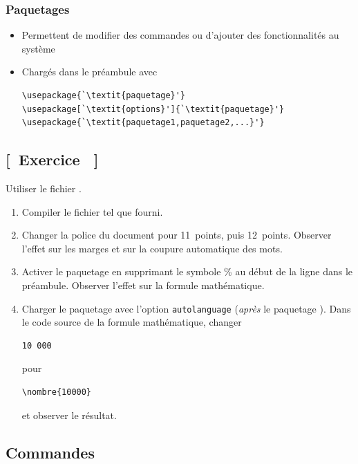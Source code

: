 \begin{frame}[fragile=singleslide]
  \frametitle{Paquetages}
  \begin{itemize}
  \item Permettent de modifier des commandes ou d'ajouter des
    fonctionnalités au système
  \item Chargés dans le préambule avec
    \begin{lstlisting}
\usepackage{`\textit{paquetage}'}
\usepackage[`\textit{options}']{`\textit{paquetage}'}
\usepackage{`\textit{paquetage1,paquetage2,...}'}
    \end{lstlisting}
  \end{itemize}
\end{frame}

\subsection{[~Exercice \theexerciceref~]}

\begin{frame}[plain,fragile=singleslide]
  \begin{exercice}
    Utiliser le fichier .
    \begin{enumerate}
    \item Compiler le fichier tel que fourni.
    \item Changer la police du document pour 11~points, puis
      12~points. Observer l'effet sur les marges et sur la coupure
      automatique des mots.
    \item Activer le paquetage  en supprimant le symbole
      \% au début de la ligne dans le préambule. Observer l'effet sur la formule mathématique.
    \item Charger le paquetage  avec l'option
      \verb=autolanguage= (\emph{après} le paquetage ).
      Dans le code source de la formule mathématique, changer
\begin{lstlisting}
10 000
\end{lstlisting}
      pour
\begin{lstlisting}
\nombre{10000}
\end{lstlisting}
      et observer le résultat.
    \end{enumerate}
  \end{exercice}
\end{frame}

\subsection{Commandes}

